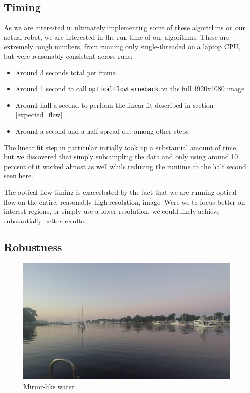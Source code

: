 \documentclass{article}
\begin{document}
\subsection{Timing}

As we are interested in ultimately implementing some of these algorithms on our
actual robot, we are interested in the run time of our algorithms. These
are extremely rough numbers, from running only single-threaded on a laptop CPU,
but were reasonably consistent across runs:
\begin{itemize}
\item Around 3 seconds total per frame
\item Around 1 second to call \texttt{opticalFlowFarneback} on the full
      1920x1080 image
\item Around half a second to perform the linear fit described in section
      \ref{expected_flow}
\item Around a second and a half spread out among other steps
\end{itemize}

The linear fit step in particular initially took up a substantial amount of
time, but we discovered that simply subsampling the data and only using around
10 percent of it worked almost as well while reducing the runtime to the half
second seen here.

The optical flow timing is exacerbated by the fact that we are running optical
flow on the entire, reasonably high-resolution, image. Were we to focus better
on interest regions, or simply use a lower resolution, we could likely achieve
substantially better results.

\subsection{Robustness}

\begin{figure}[H]
\includegraphics[width=12cm]{sample1}
\centering
\caption{Mirror-like water}
\label{fig:mirror}
\end{figure}
\end{document}
